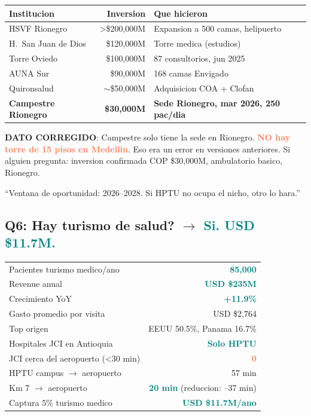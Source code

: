 \documentclass[11pt, a4paper]{article}
\newcommand{\hl}[1]{\textcolor{teal}{\textbf{#1}}}
\newcommand{\dg}[1]{\textcolor{coral}{\textbf{#1}}}
\begin{document}
\begin{tabular}{@{}l r l@{}}
\toprule
\textbf{Institucion} & \textbf{Inversion} & \textbf{Que hicieron} \\
\midrule
HSVF Rionegro & >\$200,000M & Expansion a 500 camas, helipuerto \\
H.\ San Juan de Dios & \$120,000M & Torre medica (estudios) \\
Torre Oviedo & \$100,000M & 87 consultorios, jun 2025 \\
AUNA Sur & \$90,000M & 168 camas Envigado \\
Quironsalud & $\sim$\$50,000M & Adquisicion COA + Clofan \\
\rowcolor{bgwarn}
\textbf{Campestre Rionegro} & \textbf{\$30,000M} & \textbf{Sede Rionegro, mar 2026, 250 pac/dia} \\
\bottomrule
\end{tabular}

\begin{alerta}
\textbf{DATO CORREGIDO}: Campestre solo tiene la sede en Rionegro. \dg{NO hay torre de 15 pisos en Medellin}. Eso era un error en versiones anteriores. Si alguien pregunta: inversion confirmada COP \$30,000M, ambulatorio basico, Rionegro.
\end{alerta}

\begin{cita}
``Ventana de oportunidad: 2026--2028. Si HPTU no ocupa el nicho, otro lo hara.''
\end{cita}

\subsection{Q6: Hay turismo de salud? $\to$ \hl{Si. USD \$11.7M.}}

\begin{tabular}{@{}l r@{}}
\toprule
Pacientes turismo medico/ano & \hl{85,000} \\
Revenue anual & \hl{USD \$235M} \\
Crecimiento YoY & \hl{+11.9\%} \\
Gasto promedio por visita & USD \$2,764 \\
Top origen & EEUU 50.5\%, Panama 16.7\% \\
Hospitales JCI en Antioquia & \hl{Solo HPTU} \\
JCI cerca del aeropuerto (<30 min) & \dg{0} \\
HPTU campus $\to$ aeropuerto & 57 min \\
Km 7 $\to$ aeropuerto & \hl{20 min} (reduccion: --37 min) \\
Captura 5\% turismo medico & \hl{USD \$11.7M/ano} \\
\bottomrule
\end{tabular}
\end{document}
